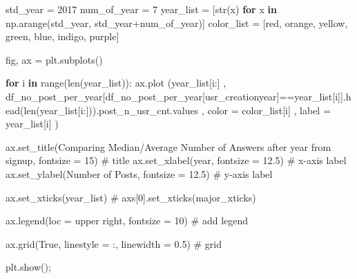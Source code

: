\documentclass[
  letterpaper,
  DIV=11,
  numbers=noendperiod]{scrartcl}
\newenvironment{Shaded}{\begin{snugshade}}{\end{snugshade}}
\newcommand{\BuiltInTok}[1]{\textcolor[rgb]{0.00,0.23,0.31}{#1}}
\newcommand{\CommentTok}[1]{\textcolor[rgb]{0.37,0.37,0.37}{#1}}
\newcommand{\ControlFlowTok}[1]{\textcolor[rgb]{0.00,0.23,0.31}{\textbf{#1}}}
\newcommand{\DecValTok}[1]{\textcolor[rgb]{0.68,0.00,0.00}{#1}}
\newcommand{\FloatTok}[1]{\textcolor[rgb]{0.68,0.00,0.00}{#1}}
\newcommand{\KeywordTok}[1]{\textcolor[rgb]{0.00,0.23,0.31}{\textbf{#1}}}
\newcommand{\NormalTok}[1]{\textcolor[rgb]{0.00,0.23,0.31}{#1}}
\newcommand{\OperatorTok}[1]{\textcolor[rgb]{0.37,0.37,0.37}{#1}}
\newcommand{\StringTok}[1]{\textcolor[rgb]{0.13,0.47,0.30}{#1}}
\newcommand{\VariableTok}[1]{\textcolor[rgb]{0.07,0.07,0.07}{#1}}
\begin{document}
\begin{Shaded}
\begin{Highlighting}[]
\NormalTok{std\_year }\OperatorTok{=} \DecValTok{2017}
\NormalTok{num\_of\_year }\OperatorTok{=} \DecValTok{7}
\NormalTok{year\_list }\OperatorTok{=}\NormalTok{ [}\BuiltInTok{str}\NormalTok{(x) }\ControlFlowTok{for}\NormalTok{ x }\KeywordTok{in}\NormalTok{ np.arange(std\_year, std\_year}\OperatorTok{+}\NormalTok{num\_of\_year)]}
\NormalTok{color\_list }\OperatorTok{=}\NormalTok{ [}\StringTok{\textquotesingle{}red\textquotesingle{}}\NormalTok{, }\StringTok{\textquotesingle{}orange\textquotesingle{}}\NormalTok{, }\StringTok{\textquotesingle{}yellow\textquotesingle{}}\NormalTok{, }\StringTok{\textquotesingle{}green\textquotesingle{}}\NormalTok{, }\StringTok{\textquotesingle{}blue\textquotesingle{}}\NormalTok{, }\StringTok{\textquotesingle{}indigo\textquotesingle{}}\NormalTok{, }\StringTok{\textquotesingle{}purple\textquotesingle{}}\NormalTok{]}

\NormalTok{fig, ax }\OperatorTok{=}\NormalTok{ plt.subplots()}

\ControlFlowTok{for}\NormalTok{ i }\KeywordTok{in} \BuiltInTok{range}\NormalTok{(}\BuiltInTok{len}\NormalTok{(year\_list)):   }
\NormalTok{        ax.plot (year\_list[i:]}
\NormalTok{        , df\_no\_post\_per\_year[df\_no\_post\_per\_year[}\StringTok{\textquotesingle{}usr\_creationyear\textquotesingle{}}\NormalTok{]}\OperatorTok{==}\NormalTok{year\_list[i]].head(}\BuiltInTok{len}\NormalTok{(year\_list[i:])).post\_n\_usr\_cnt.values}
\NormalTok{        ,  color }\OperatorTok{=}\NormalTok{ color\_list[i]}
\NormalTok{        ,  label }\OperatorTok{=}\NormalTok{ year\_list[i]}
\NormalTok{        ) }


\NormalTok{ax.set\_title(}\StringTok{\textquotesingle{}Comparing Median/Average Number of Answers after year from signup\textquotesingle{}}\NormalTok{, fontsize }\OperatorTok{=} \DecValTok{15}\NormalTok{) }\CommentTok{\# title}
\NormalTok{ax.set\_xlabel(}\StringTok{\textquotesingle{}year\textquotesingle{}}\NormalTok{, fontsize }\OperatorTok{=} \FloatTok{12.5}\NormalTok{) }\CommentTok{\# x{-}axis label}
\NormalTok{ax.set\_ylabel(}\StringTok{\textquotesingle{}Number of Posts\textquotesingle{}}\NormalTok{, fontsize }\OperatorTok{=} \FloatTok{12.5}\NormalTok{) }\CommentTok{\# y{-}axis label}

\NormalTok{ax.set\_xticks(year\_list)}
\CommentTok{\# axs[0].set\_xticks(major\_xticks)}

\NormalTok{ax.legend(loc }\OperatorTok{=} \StringTok{\textquotesingle{}upper right\textquotesingle{}}\NormalTok{, fontsize }\OperatorTok{=} \DecValTok{10}\NormalTok{) }\CommentTok{\# add legend}

\NormalTok{ax.grid(}\VariableTok{True}\NormalTok{, linestyle }\OperatorTok{=} \StringTok{\textquotesingle{}:\textquotesingle{}}\NormalTok{, linewidth }\OperatorTok{=} \FloatTok{0.5}\NormalTok{) }\CommentTok{\# grid}

\NormalTok{plt.show()}\OperatorTok{;}
\end{Highlighting}
\end{Shaded}
\end{document}

